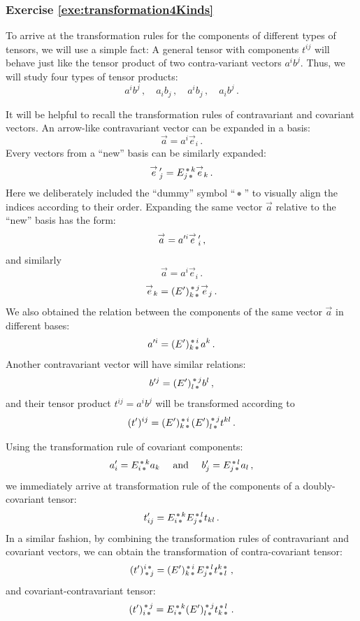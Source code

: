 \subsubsection*{Exercise \ref{exe:transformation4Kinds}}
To arrive at the transformation rules for the components of different
types of tensors, we will use a simple fact: A general tensor with
components $t^{ij}$ will behave just like the tensor product of two
contra-variant vectors $a^ib^j$. Thus, we will study four types of
tensor products:
\[
a^ib^j\,,\quad a_ib_j\,,\quad a^ib_j\,,\quad a_ib^j\,.
\]

It will be helpful to recall the transformation rules of
contravariant and covariant vectors. An arrow-like contravariant
vector can be expanded in a basis:
\[
\vec{a}=a^i\vec{e}_i\,.
\]
Every vectors from a ``new'' basis can be similarly expanded:
\[
\vecp{e}_j = E_{j\tus}^{\tus k}\vec{e}_k\,.
\]
Here we deliberately included the ``dummy'' symbol ``$\tus$'' to
visually align the indices according to their order.
Expanding the same vector $\vec{a}$ relative to the ``new'' basis has
the form:
\[
\overset{\rightarrow}{a}=a'^i\overset{\rightarrow}{e}\,'_i\,,
\]
and similarly
\[
\vec{a}=a^i\vec{e}_i\,.
\]\[
\vec{e}_k = (E')_{k\tus}^{\tus j}\vec{e}_j\,.
\]
We also obtained the relation between the components of the same
vector $\vec{a}$ in different bases:
\[
a'^i = (E')_{k\tus}^{\tus i}a^k\,.
\]
Another contravariant vector will have similar relations:
\[
b'^j = (E')_{l\tus}^{\tus j}b^l\,,
\]
and their tensor product $t^{ij} = a^ib^j$ will be transformed
according to
\[
(t')^{ij} = (E')_{k\tus}^{\tus i}(E')_{l\tus}^{\tus j}t^{kl}\,.
\]

Using the transformation rule of covariant components:
\[
a'_i = E_{i\tus}^{\tus k}a_k\quad\textrm{ and }\quad
b'_j = E_{j\tus}^{\tus l}a_l\,,
\]
we immediately arrive at transformation rule of the components of a
doubly-covariant tensor:
\[
t'_{ij} = E_{i\tus}^{\tus k}E_{j\tus}^{\tus l}t_{kl}\,.
\]
In a similar fashion, by combining the transformation rules of
contravariant and covariant vectors, we can obtain the transformation
of contra-covariant tensor:
\[
(t')^{i\tus}_{\tus j} = (E')_{k\tus}^{\tus i} E_{j\tus}^{\tus l} t^{k\tus}_{\tus l}\,,
\]
and covariant-contravariant tensor:
\[
(t')_{i\tus}^{\tus j } = E_{i\tus}^{\tus k}(E')_{l\tus}^{\tus j}t_{k\tus}^{\tus l}\,.
\]

